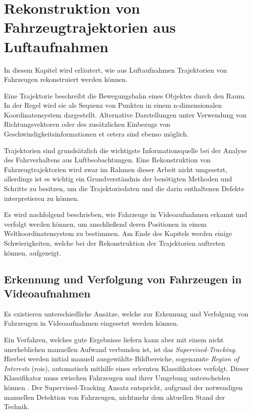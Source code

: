 
\chapter{Rekonstruktion von Fahrzeugtrajektorien aus Luftaufnahmen}
\label{sec:position_extraction}

In diesem Kapitel wird erläutert, wie aus Luftaufnahmen Trajektorien von Fahrzeugen rekonstruiert werden können.

\begin{theorem}[Trajektorie]
    Eine Trajektorie beschreibt die Bewegungsbahn eines Objektes durch den Raum.
    In der Regel wird sie als Sequenz von Punkten in einem n-dimensionalen Koordinatensystem dargestellt.
    Alternative Darstellungen unter Verwendung von Richtungsvektoren oder des zusätzlichen
    Einbezugs von Geschwindigkeitsinformationen et cetera sind ebenso möglich.
\end{theorem}

Trajektorien sind grundsätzlich die wichtigste Informationsquelle bei der Analyse des Fahrverhaltens aus Luftbeobachtungen.
Eine Rekonstruktion von Fahrzeugtrajektorien wird zwar im Rahmen dieser Arbeit nicht umgesetzt,
allerdings ist es wichtig ein Grundverständnis der benötigten Methoden und Schritte zu besitzen,
um die Trajektoriedaten und die darin enthaltenen Defekte interpretieren zu können.

Es wird nachfolgend beschrieben, wie Fahrzeuge in Videoaufnahmen erkannt und verfolgt
werden können, um anschließend deren Positionen in einem Weltkoordinatensystem zu bestimmen. Am Ende des Kapitels
werden einige Schwierigkeiten, welche bei der Rekonstruktion der Trajektorien auftreten können, aufgezeigt.

\section{Erkennung und Verfolgung von Fahrzeugen in Videoaufnahmen}

Es existieren unterschiedliche Ansätze, welche zur Erkennung und Verfolgung von Fahrzeugen in Videoaufnahmen
eingesetzt werden können.

Ein Verfahren, welches gute Ergebnisse liefern kann aber mit einem nicht unerheblichen manuellen Aufwand verbunden ist,
ist das \textit{Supervised-Tracking}. Hierbei werden initial manuell ausgewählte Bildbereiche, sogenannte
\textit{Region of Interests} (\acrshort*{roi}s), automatisch mithilfe eines erlernten Klassifikators verfolgt.
Dieser Klassifikator muss zwischen Fahrzeugen und ihrer Umgebung unterscheiden können \cite[]{Grabner}.
Der Supervised-Tracking Ansatz entspricht, aufgrund der notwendigen manuellen Detektion von Fahrzeugen, nichtmehr
dem aktuellen Stand der Technik.

